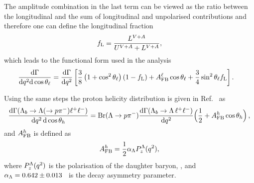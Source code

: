 The amplitude combination in the last term can be viewed as the ratio between the longitudinal and the sum of
longitudinal and unpolarised contributions and therefore one can define the longitudinal fraction
\begin{equation}
f_{\rm L}=\frac{L^{V+A}}{U^{V+A}+L^{V+A}},
\end{equation}
which leads to the functional form used in the analysis
\begin{align}
\frac{\mathrm{d}\Gamma}{\mathrm{d}q^2\mathrm{d}\cos\theta_\ell}=
\frac{\mathrm{d}\Gamma}{\mathrm{d}q^2}&\left[  \frac{3}{8}\left(1+\cos^2\theta_\ell\right)(1-f_{\rm L})+A_{\rm FB}^\ell\cos\theta_\ell +
   \frac{3}{4}\sin^2\theta_\ell f_{\rm L}\right]. 
   \label{eq:afbLTh}
\end{align}

Using the same steps the proton helicity distribution is given in Ref.~\cite{Gutsche:2013pp} as
\begin{equation}
\frac{\mathrm{d}\Gamma(\Lambda_{b}\to \Lambda(\to p \pi^{-})\ell^{+}\ell^{-})}
     {\mathrm{d}\qsq\,\mathrm{d}\cos\theta_h} 
={\rm Br}(\Lambda \to p\pi^{-})
 \frac{\mathrm{d}\Gamma(\Lambda_b \to \Lambda\, \ell^{+}\ell^{-})}{\mathrm{d}\qsq}
\Big(\frac{1}{2}+\afbh\cos\theta_h\Big) \,,
\label{eq:afbBTh}
\end{equation}
and $A_{\rm FB}^h$ is defined as
\begin{equation}
A_{\rm FB}^h=\frac{1}{2}\alpha_{\Lambda}P_z^\Lambda(q^2),
\end{equation} 
where $P_z^\Lambda(q^2)$ is the polarisation of the daughter baryon, \Lz,
and $\alpha_{\Lambda} = 0.642 \pm 0.013$~\cite{PDG2014} is the \Lz decay asymmetry parameter.



